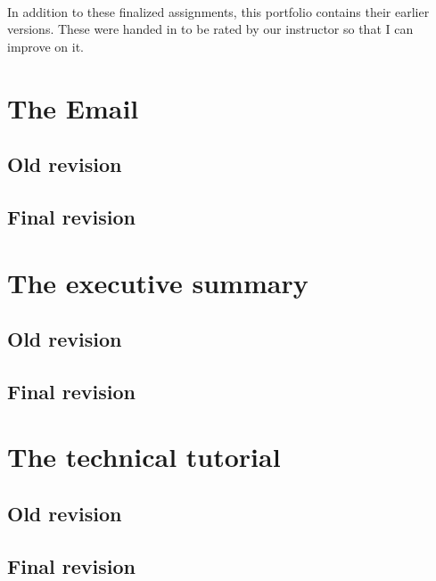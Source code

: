 \documentclass[11pt,english]{article}
\begin{document}
	\paragraph{}
	In addition to these finalized assignments, this portfolio contains their
	earlier versions. These were handed in to be rated by our instructor so
	that I can improve on it.

	\newpage
	\tableofcontents

	\newpage
	\section{The Email}
	\subsection{Old revision}
	

	\newpage
	\subsection{Final revision}
	

	\newpage
	\section{The executive summary}
	\subsection{Old revision}
	

	\newpage
	\subsection{Final revision}
	

	\newpage
	\section{The technical tutorial}
	\subsection{Old revision}
	

	\newpage
	\subsection{Final revision}
	
\end{document}
